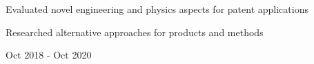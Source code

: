 \begin{detail}
\vspace{-2.5ex}
\BulletItem
Evaluated novel engineering and physics aspects for patent applications

\BulletItem
Researched alternative approaches for products and methods
\end{detail}

\begin{subtitle}
\vspace{-7.8ex}
{{Oct 2018 - Oct 2020}} 
\end{subtitle}

\begin{subtitle}
\vspace{-2.0ex}
\end{subtitle}


